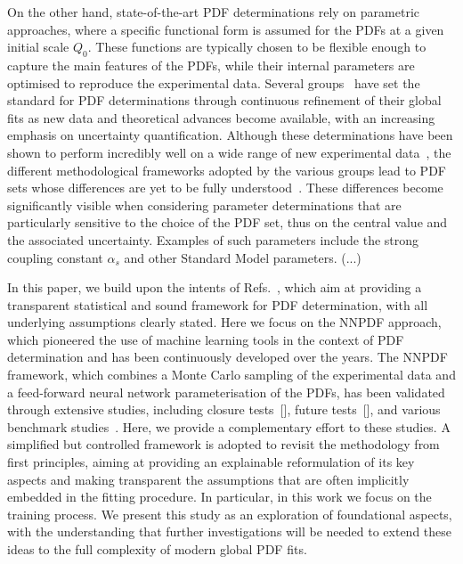 On the other hand, state-of-the-art PDF determinations rely on parametric approaches,
where a specific functional form is assumed for the PDFs at a given initial
scale $Q_0$. These functions are typically chosen to be flexible enough to
capture the main features of the PDFs, while their internal parameters are
optimised to reproduce the experimental data. Several
groups~\cite{NNPDF:2021njg,Ablat:2024hbm,Bailey:2020ooq,Alekhin:2017kpj} have
set the standard for PDF determinations through continuous refinement of their
global fits as new data and theoretical advances become available, with an
increasing emphasis on uncertainty quantification. Although these determinations
have been shown to perform incredibly well on a wide range of new experimental
data~\cite{Chiefa:2025loi}, the different methodological frameworks adopted by
the various groups lead to PDF sets whose differences are yet to be fully
understood~\cite{Harland-Lang:2024kvt}. These differences become significantly
visible when considering parameter determinations that are particularly
sensitive to the choice of the PDF set, thus on the central value and the
associated uncertainty. Examples of such parameters include the strong coupling
constant $\alpha_s$ and other Standard Model parameters. (\ac{...})

In this paper, we build upon the intents of
Refs.~\cite{DelDebbio:2021whr,Candido:2024hjt}, which aim at providing a
transparent statistical and sound framework for PDF determination, with all
underlying assumptions clearly stated. Here we focus on the NNPDF approach,
which pioneered the use of machine learning tools in the context of PDF
determination and has been continuously developed over the years. The
NNPDF framework, which combines a Monte Carlo sampling of the experimental data
and a feed-forward neural network parameterisation of the PDFs, has been
validated through extensive studies, including closure tests~[], future
tests~[], and various benchmark studies~\cite{Harland-Lang:2024kvt}. Here,
we provide a complementary effort to these studies. A simplified but controlled
framework is adopted to revisit the methodology from first principles, aiming at
providing an explainable reformulation of its key aspects and making transparent
the assumptions that are often implicitly embedded in the fitting procedure. In
particular, in this work we focus on the training process. We present this study
as an exploration of foundational aspects, with the understanding that further
investigations will be needed to extend these ideas to the full complexity of
modern global PDF fits.

